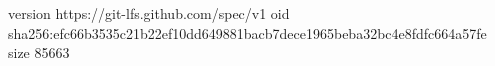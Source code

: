 version https://git-lfs.github.com/spec/v1
oid sha256:efc66b3535c21b22ef10dd649881bacb7dece1965beba32bc4e8fdfc664a57fe
size 85663
